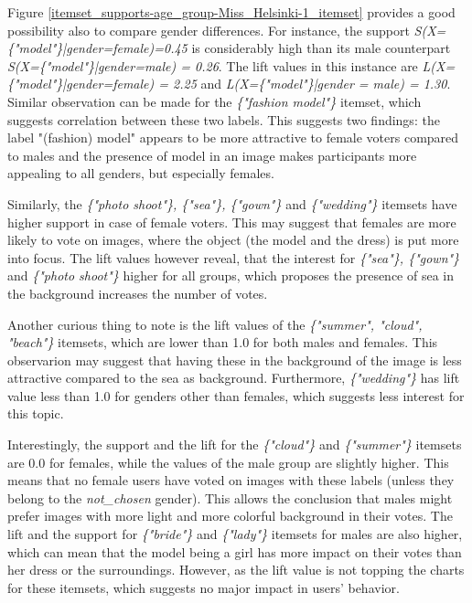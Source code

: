 Figure \ref{itemset_supports-age_group-Miss_Helsinki-1_itemset} provides a good possibility also to compare gender differences. For instance, the support \emph{S(X=\{"model"\}|gender=female)=0.45} is considerably high than its male counterpart \emph{S(X=\{"model"\}|gender=male) = 0.26}. The lift values in this instance are \emph{L(X=\{"model"\}|gender=female) = 2.25} and \emph{L(X=\{"model"\}|gender = male) = 1.30}. Similar observation can be made for the \emph{\{"fashion model"\}} itemset, which suggests correlation between these two labels. This suggests two findings: the label "(fashion) model" appears to be more attractive to female voters compared to males and the presence of model in an image makes participants more appealing to all genders, but especially females. 

Similarly, the \emph{\{"photo shoot"\}, \{"sea"\}, \{"gown"\}} and \emph{\{"wedding"\}} itemsets have higher support in case of female voters. This may suggest that females are more likely to vote on images, where the object (the model and the dress) is put more into focus. The lift values however reveal, that the interest for \emph{\{"sea"\}, \{"gown"\}} and \emph{\{"photo shoot"\}} higher for all groups, which proposes the presence of sea in the background increases the number of votes. 

Another curious thing to note is the lift values of the \emph{\{"summer", "cloud", "beach"\}} itemsets, which are lower than 1.0 for both males and females. This observarion may suggest that having these in the background of the image is less attractive compared to the sea as background. Furthermore, \emph{\{"wedding"\}} has lift value less than 1.0 for genders other than females, which suggests less interest for this topic.  

Interestingly, the support and the lift for the \emph{\{"cloud"\}} and \emph{\{"summer"\}} itemsets are 0.0 for females, while the values of the male group are slightly higher. This means that no female users have voted on images with these labels (unless they belong to the \emph{not\_chosen} gender). This allows the conclusion that males might prefer images with more light and more colorful background in their votes. The lift and the support for \emph{\{"bride"\}} and \emph{\{"lady"\}} itemsets for males are also higher, which can mean that the model being a girl has more impact on their votes than her dress or the surroundings. However, as the lift value is not topping the charts for these itemsets, which suggests no major impact in users' behavior.


